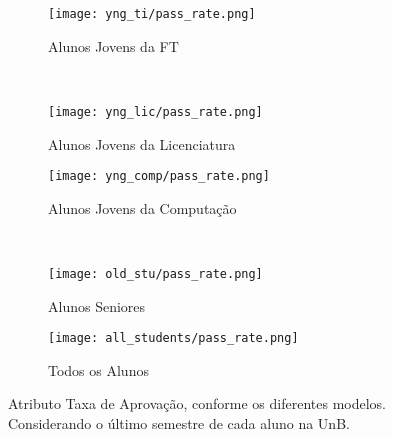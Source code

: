 \clearpage
\begin{figure}[!ht]
    \centering
    \begin{subfigure}[b]{0.48\textwidth}
        \centering
        \texttt{[image: yng\_ti/pass\_rate.png]}
        \caption{Alunos Jovens da FT}
    \end{subfigure}
    ~
    \begin{subfigure}[b]{0.48\textwidth}
        \centering
        \texttt{[image: yng\_lic/pass\_rate.png]}
        \caption{Alunos Jovens da Licenciatura}
    \end{subfigure}

    \begin{subfigure}[b]{0.48\textwidth}
        \centering
        \texttt{[image: yng\_comp/pass\_rate.png]}
        \caption{Alunos Jovens da Computação}
    \end{subfigure}
    ~
    \begin{subfigure}[b]{0.48\textwidth}
        \centering
        \texttt{[image: old\_stu/pass\_rate.png]}
        \caption{Alunos Seniores}
    \end{subfigure}

    \begin{subfigure}[b]{0.48\textwidth}
        \centering
        \texttt{[image: all\_students/pass\_rate.png]}
        \caption{Todos os Alunos}
    \end{subfigure}
    \caption{Atributo Taxa de Aprovação, conforme os diferentes modelos. Considerando
    o último semestre de cada aluno na UnB.}
\end{figure}

